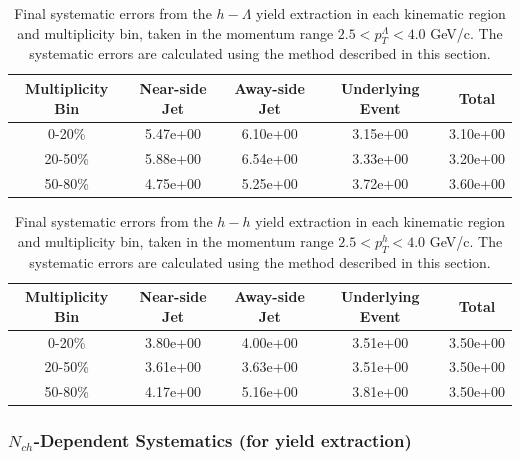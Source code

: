 \documentclass[ALICE,manyauthors]{ALICE_analysis_notes}
\begin{document}
\begin{table}[h!]
\centering
\begin{tabular}{| c | c | c | c | c | }
\hline
Multiplicity Bin & Near-side Jet & Away-side Jet & Underlying Event & Total  \\
\hline
0-20\% & 5.47e+00 & 6.10e+00  & 3.15e+00 & 3.10e+00 \\
20-50\% & 5.88e+00 & 6.54e+00  & 3.33e+00 & 3.20e+00 \\
50-80\% & 4.75e+00 & 5.25e+00  & 3.72e+00 & 3.60e+00 \\
\hline
\end{tabular}
\caption{Final systematic errors from the $h-\Lambda$ yield extraction in each kinematic region and multiplicity bin, taken in the momentum range $2.5 < p_{T}^{\Lambda} < 4.0$ GeV/c. The systematic errors are calculated using the method described in this section.}
\label{h_lambda_yield_extraction_systematics_highpt}
\end{table}
\begin{table}[h!]
\centering
\begin{tabular}{| c | c | c | c | c | }
\hline
Multiplicity Bin & Near-side Jet & Away-side Jet & Underlying Event & Total  \\
\hline
0-20\% & 3.80e+00   & 4.00e+00  & 3.51e+00 & 3.50e+00 \\
20-50\% & 3.61e+00 & 3.63e+00  & 3.51e+00 & 3.50e+00 \\
50-80\% & 4.17e+00 & 5.16e+00  & 3.81e+00 & 3.50e+00 \\
\hline
\end{tabular}
\caption{Final systematic errors from the $h-h$ yield extraction in each kinematic region and multiplicity bin, taken in the momentum range $2.5 < p_{T}^{h} < 4.0$ GeV/c. The systematic errors are calculated using the method described in this section.}
\label{h_h_yield_extraction_systematics_highpt}
\end{table}

\subsubsection{$N_{ch}$-Dependent Systematics (for yield extraction)}
\end{document}
